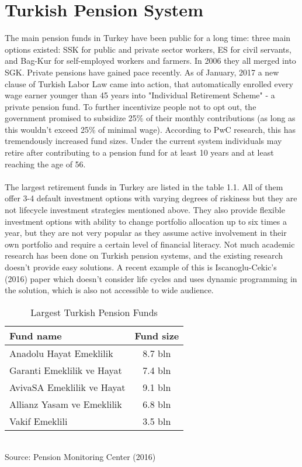 \section{Turkish Pension System}
The main pension funds in Turkey have been public for a long time: three main options existed: SSK for public and private sector workers, ES for civil servants, and Bag-Kur for self-employed workers and farmers. In 2006 they all merged into SGK. Private pensions have gained pace recently. As of January, 2017 a new clause of Turkish Labor Law came into action, that automatically enrolled every wage earner younger than 45 years into "Individual Retirement Scheme" - a private pension fund. To further incentivize people not to opt out, the government promised to subsidize 25\% of their monthly contributions (as long as this wouldn't exceed 25\% of minimal wage). According to PwC research, this has tremendously increased fund sizes. Under the current system individuals may retire after contributing to a pension fund for at least 10 years and at least reaching the age of 56.
\paragraph*{}
The largest retirement funds in Turkey are listed in the table 1.1. All of them offer 3-4 default investment options with varying degrees of riskiness but they are not lifecycle investment strategies mentioned above. They also provide flexible investment options with ability to change portfolio allocation up to six times a year, but they are not very popular as they assume active involvement in their own portfolio and require a certain level of financial literacy. Not much academic research has been done on Turkish pension systems, and the existing research doesn't provide easy solutions. A recent example of this is Iscanoglu-Cekic's (2016) paper which doesn't consider life cycles and uses dynamic programming in the solution, which is also not accessible to wide audience.

\begin{table}
	\centering
	\caption{Largest Turkish Pension Funds}
	\begin{tabular}[H]{lc}
		\hline
		Fund name&Fund size\\
		\hline
		Anadolu Hayat Emeklilik&8.7 bln\\
		Garanti Emeklilik ve Hayat&7.4 bln\\
		AvivaSA Emeklilik ve Hayat&9.1 bln\\
		Allianz Yasam ve Emeklilik&6.8 bln\\
		Vakif Emeklili&3.5 bln\\
		\hline
	\end{tabular}\\
	Source: Pension Monitoring Center (2016)
\end{table}

